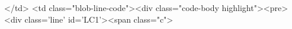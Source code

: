            </td>
           <td class="blob-line-code"><div class="code-body highlight"><pre><div class='line' id='LC1'><span class="c">%